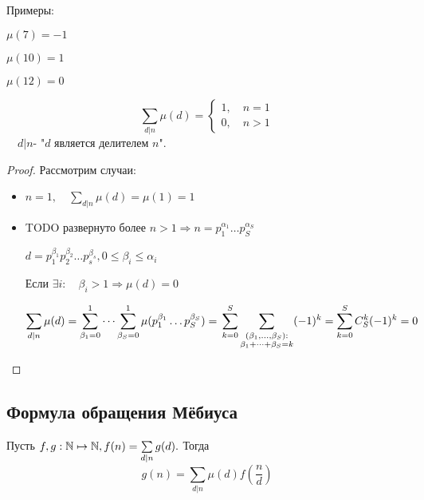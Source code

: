 Примеры:

$\mu (7) = -1 $

$\mu (10) = 1 $

$\mu (12) = 0 $
 
\begin{alem}

\[
\displaystyle
\sum \limits _{d|n} \mu(d) = 
\begin{cases} 
1, \quad n = 1 \\
0, \quad n > 1
\end{cases}
\] 
$  \quad d|n $- "$d$ является делителем $n$".


\end{alem}



\begin{proof}
Рассмотрим случаи:
\begin{itemize}

\item 
$
n = 1, \quad \sum\limits_{d|n} \mu(d) = \mu(1) = 1
$
\item
TODO развернуто более
$
n > 1 \Rightarrow    n = p_1 ^ {\alpha_1} \dots p_S ^ {\alpha_S} $

$
 d = p_1^{\beta_1} p_2^{\beta_2} \dots p_s^{\beta_s}, 0 \leq \beta_i \leq \alpha_i
$

Если 
$
\exists i : \quad \beta_i > 1 \Rightarrow \mu(d) = 0
$


$\displaystyle
\sum \limits _{d|n} \mu(d) =  
\sum\limits_{\beta_1 = 0}^1 \dots \sum \limits _{\beta_S = 0} ^1 \mu (p_1^{\beta_1}\dots p_S^{\beta_S} ) = \\
\sum \limits ^S _{k=0} \sum _{\substack {
( \beta_1, \dots, \beta_S) : \\
\beta_1 + \dots + \beta_S = k
}} (-1)^k = \sum \limits _{k=0} ^S C^k_S (-1)^k = 0 
$
\end{itemize}
\end{proof}
\subsection{Формула обращения Мёбиуса}

Пусть $ f,g: \mathbb{N} \mapsto \mathbb{N},  f(n) = \sum \limits _ {d | n} g(d). $ Тогда 
\[
g(n) = \sum \limits _{d|n} \mu(d) f(\frac n d )
\]

